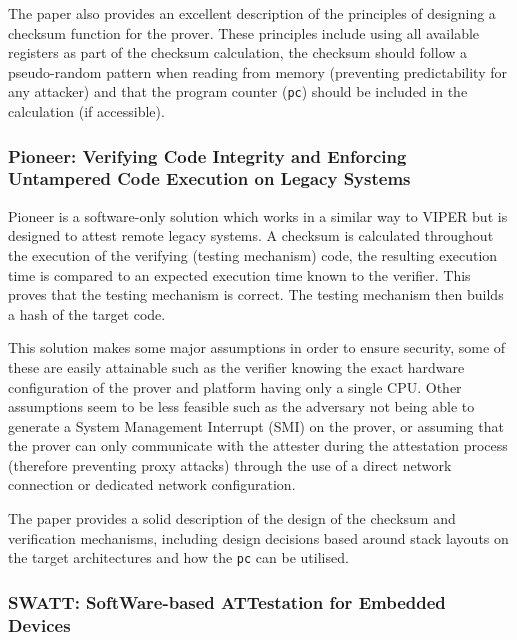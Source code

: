 The paper \cite{Li2011} also provides an excellent description of the principles of designing a checksum function for the prover. These principles include using all available registers as part of the checksum calculation, the checksum should follow a pseudo-random pattern when reading from memory (preventing predictability for any attacker) and that the program counter (\verb|pc|) should be included in the calculation (if accessible). 

\subsubsection{Pioneer: Verifying Code Integrity and Enforcing Untampered Code Execution on Legacy Systems}

Pioneer \cite{Seshadri2007} is a software-only solution which works in a similar way to VIPER but is designed to attest remote legacy systems. A checksum is calculated throughout the execution of the verifying (testing mechanism) code, the resulting execution time is compared to an expected execution time known to the verifier. This proves that the testing mechanism is correct. The testing mechanism then builds a hash of the target code. 

This solution makes some major assumptions in order to ensure security, some of these are easily attainable such as the verifier knowing the exact hardware configuration of the prover and platform having only a single CPU. Other assumptions seem to be less feasible such as the adversary not being able to generate a System Management Interrupt (SMI) on the prover, or assuming that the prover can only communicate with the attester during the attestation process (therefore preventing proxy attacks) through the use of a direct network connection or dedicated network configuration.

The paper provides a solid description of the design of the checksum and verification mechanisms, including design decisions based around stack layouts on the target architectures and how the \verb|pc| can be utilised.

\subsubsection{SWATT: SoftWare-based ATTestation for Embedded Devices}


